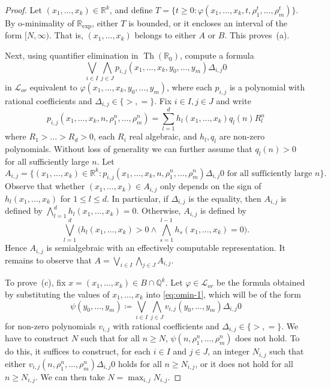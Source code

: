 \documentclass[a4paper,UKenglish,cleveref]{lipics-v2021}
\newcommand{\rel}{\mathbb{R}}
\newcommand{\rat}{\mathbb{Q}}
\newcommand{\Lcal}{\mathcal{L}}
\begin{document}
\begin{proof}
	Let $(x_1,\ldots,x_k) \in \rel^k$, and define $T = \{ t \ge 0 \colon \varphi(x_1,\ldots,x_k, t,  \rho_1^t,\ldots,\rho_m^t)\}$.
	By o-minimality of $\rel_{\exp}$, either $T$ is bounded, or it encloses an interval of the form $[N,\infty)$.
	That is, $(x_1,\ldots,x_k)$ belongs to either $A$ or $B$.
	This proves~(a).
	
	Next, using quantifier elimination in $\operatorname{Th}(\rel_0)$, compute a formula 
	\begin{equation}
		\label{eq:omin-1}
		\bigvee_{i \in I} \bigwedge_{j \in J} p_{i,j}(x_1, \ldots,x_k, y_0,\ldots,y_m) \mathrel{\Delta_{i,j}} 0
	\end{equation}
	in $\Lcal_{or}$ equivalent to $\varphi(x_1,\ldots,x_k,y_0,\ldots,y_m)$, where each $p_{i,j}$ is a polynomial with rational coefficients and $\Delta_{i,j} \in \{>, =\}$.
	Fix $i \in I, j \in J$ and write
	\[
	p_{i,j}(x_1, \ldots,x_k, n,  \rho_1^n,\ldots,\rho_m^n) = \sum_{l=1}^d h_l(x_1,\ldots,x_k) q_l(n) R_l^n
	\]
	where $R_1 > \ldots > R_d > 0$, each $R_i$ real algebraic, and $h_l,q_l$ are non-zero polynomials.
	Without loss of generality we can further assume that $q_l(n) > 0$ for all sufficiently large $n$.
	Let
	\[
	A_{i,j} = \{(x_1,\ldots,x_k) \in \rel^k \colon p_{i,j}(x_1,\ldots,x_k, n, \rho_1^n,\ldots,\rho_m^n) \mathrel{\Delta_{i,j}} 0 \textrm{ for all sufficiently large $n$}\}.
	\]
	Observe that whether $(x_1,\ldots,x_k) \in A_{i,j}$ only depends on the sign of $h_l(x_1,\ldots,x_k)$ for $1 \le l \le d$.
	In particular, if $\Delta_{i,j}$ is the equality, then $A_{i,j}$ is defined by $\bigwedge_{l=1}^d h_l(x_1,\ldots,x_k) = 0$.
	Otherwise, $A_{i,j}$ is defined by 
	\[
	\bigvee_{l=1}^d  \biggl(
	h_l(x_1,\ldots,x_k) > 0 \land \bigwedge_{s=1}^{l-1} h_s(x_1,\ldots,x_k) = 0
	\biggr). 
	\]
	Hence $A_{i,j}$ is semialgebraic with an effectively computable representation. 
	It remains to observe that $A = \bigvee_{i \in I} \bigwedge_{j \in J} A_{i,j}$.
	
	To prove~(c), fix $x= (x_1,\ldots,x_k) \in B \cap \rat^k$.
	Let $\varphi \in \Lcal_{or}$ be the formula obtained by substituting the values of $x_1,\ldots,x_k$ into \eqref{eq:omin-1}, which will be of the form
	\[
	\psi(y_0,\ldots,y_m) \coloneqq \bigvee_{i \in I} \bigwedge_{j \in J} v_{i,j}(y_0,\ldots,y_m) \mathrel{\Delta_{i,j}} 0
	\]
	for non-zero polynomials $v_{i,j}$ with rational coefficients and $\Delta_{i,j} \in \{>, =\}$.
	We have to construct $N$ such that for all $n \ge N$, $\psi(n, \rho_1^n,\ldots,\rho_m^n)$ does not hold.
	To do this, it suffices to construct, for each $i \in I$ and $j \in J$, an integer $N_{i,j}$ such that either $v_{i,j}(n, \rho_1^n,\ldots,\rho_m^n) \mathrel{\Delta_{i,j}} 0$ holds for all $n \ge N_{i,j}$, or it does not hold for all $n \ge N_{i,j}$.
	We can then take $N = \max_{i,j} N_{i,j}$.
	

\end{proof}
\end{document}
